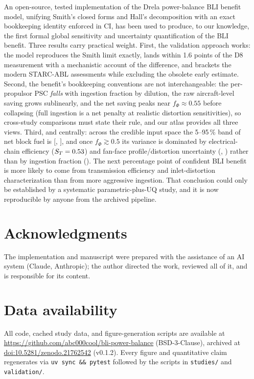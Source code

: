 \documentclass[10pt]{article}
\begin{document}
An open-source, tested implementation of the Drela power-balance BLI
benefit model, unifying Smith's closed forms and Hall's decomposition
with an exact bookkeeping identity enforced in CI, has been used to
produce, to our knowledge, the first formal global sensitivity and
uncertainty quantification
of the BLI benefit. Three results carry practical weight. First, the
validation approach works: the model reproduces the Smith limit exactly,
lands within 1.6 points of the D8 measurement with a mechanistic account of
the difference, and brackets the modern STARC-ABL assessments while
excluding the obsolete early estimate. Second, the benefit's bookkeeping
conventions are not interchangeable: the per-propulsor PSC \emph{falls}
with ingestion fraction by dilution, the raw aircraft-level saving grows
sublinearly, and the net saving peaks near $f_\Phi\approx0.55$ before
collapsing (full ingestion is a net penalty at realistic distortion
sensitivities), so cross-study comparisons must state their rule, and
our atlas provides all three views. Third, and centrally: across the
credible input space the 5--95\,\% band of net block fuel is
[\numUQFuelPlo, \numUQFuelPhi], and once $f_\Phi\gtrsim0.5$ its variance
is dominated by electrical-chain efficiency ($S_T=0.53$) and
fan-face profile/distortion uncertainty (\numSobolCondN,
\numSobolCondKdist) rather than by ingestion fraction
(\numSobolCondFphi). The next percentage point of
confident BLI benefit is more likely to come from transmission efficiency
and inlet-distortion characterization than from more aggressive ingestion.
That conclusion could only be established by a systematic
parametric-plus-UQ study, and it is now reproducible by anyone from the
archived pipeline.

\section*{Acknowledgments}
The implementation and manuscript were prepared with the assistance of an
AI system (Claude, Anthropic); the author directed the work, reviewed all
of it, and is responsible for its content.

\section*{Data availability}
All code, cached study data, and figure-generation scripts are available
at \url{https://github.com/abc000cool/bli-power-balance} (BSD-3-Clause),
archived at \href{https://doi.org/10.5281/zenodo.21762542}{doi:10.5281/zenodo.21762542}
(v0.1.2).
Every figure and quantitative claim regenerates via
\texttt{uv sync \&\& pytest} followed by the scripts in
\texttt{studies/} and \texttt{validation/}.
\end{document}
